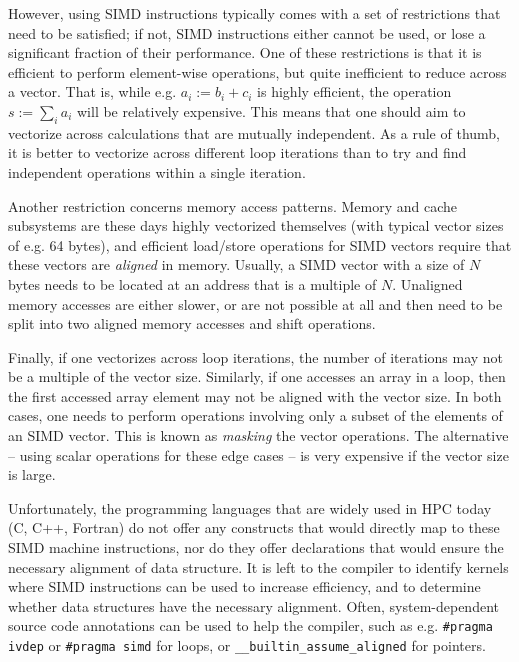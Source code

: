 \documentclass[conference]{IEEEtran}
\begin{document}
However, using SIMD instructions typically comes with a set of
restrictions that need to be satisfied; if not, SIMD instructions
either cannot be used, or lose a significant fraction of their
performance. One of these restrictions is that it is efficient to
perform element-wise operations, but quite inefficient to reduce
across a vector. That is, while e.g. $a_i:=b_i+c_i$ is highly
efficient, the operation $s:=\sum_i a_i$ will be relatively expensive.
This means that one should aim to vectorize across calculations that
are mutually independent. As a rule of thumb, it is better to
vectorize across different loop iterations than to try and find
independent operations within a single iteration.

Another restriction concerns memory access patterns. Memory and cache
subsystems are these days highly vectorized themselves (with
typical vector sizes of e.g. 64 bytes), and efficient
load/store operations for SIMD vectors require that these vectors are
\emph{aligned} in memory. Usually, a SIMD vector with a size of $N$
bytes needs to be located at an address that is a multiple of $N$.
Unaligned memory accesses are either slower, or are not possible at
all and then need to be split into two aligned memory accesses and
shift operations.

Finally, if one vectorizes across loop iterations, the number of
iterations may not be a multiple of the vector size. Similarly, if one
accesses an array in a loop, then the first accessed array element may
not be aligned with the vector size. In both cases, one needs to
perform operations involving only a subset of the elements of an SIMD
vector. This is known as \emph{masking} the vector operations. The
alternative -- using scalar operations for these edge cases --
is very expensive if the vector size is large.

Unfortunately, the programming languages that are widely used in HPC today
(C, C++, Fortran) do not offer any constructs that would directly map
to these SIMD machine instructions, nor do they offer declarations
that would ensure the necessary alignment of data structure. It is
left to the compiler to identify kernels where SIMD instructions can
be used to increase efficiency, and to determine whether data
structures have the necessary alignment.
Often,
system-dependent source code annotations can be used to help the
compiler, such as e.g. \verb+#pragma ivdep+ or \verb+#pragma simd+ for
loops, or \verb+__builtin_assume_aligned+ for pointers.
\end{document}
